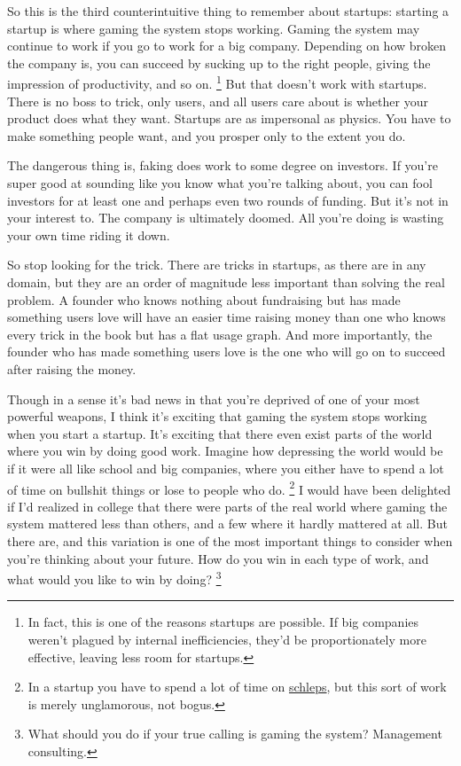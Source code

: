 So this is the third counterintuitive thing to remember about startups:
starting a startup is where gaming the system stops working. Gaming the
system may continue to work if you go to work for a big company.
Depending on how broken the company is, you can succeed by sucking up to
the right people, giving the impression of productivity, and so on.
\footnote{In fact, this is one of the reasons startups are possible. If
big companies weren't plagued by internal inefficiencies, they'd be
proportionately more effective, leaving less room for startups.} But that doesn't work with startups. There is no
boss to trick, only users, and all users care about is whether your
product does what they want. Startups are as impersonal as physics. You
have to make something people want, and you prosper only to the extent
you do.

The dangerous thing is, faking does work to some degree on investors. If
you're super good at sounding like you know what you're talking about,
you can fool investors for at least one and perhaps even two rounds of
funding. But it's not in your interest to. The company is ultimately
doomed. All you're doing is wasting your own time riding it down.

So stop looking for the trick. There are tricks in startups, as there
are in any domain, but they are an order of magnitude less important
than solving the real problem. A founder who knows nothing about
fundraising but has made something users love will have an easier time
raising money than one who knows every trick in the book but has a flat
usage graph. And more importantly, the founder who has made something
users love is the one who will go on to succeed after raising the money.

Though in a sense it's bad news in that you're deprived of one of your
most powerful weapons, I think it's exciting that gaming the system
stops working when you start a startup. It's exciting that there even
exist parts of the world where you win by doing good work. Imagine how
depressing the world would be if it were all like school and big
companies, where you either have to spend a lot of time on bullshit
things or lose to people who do. \footnote{In a startup you have to spend a lot of time on
\href{schlep.html}{schleps}, but this sort of work is merely
unglamorous, not bogus.} I would have
been delighted if I'd realized in college that there were parts of the
real world where gaming the system mattered less than others, and a few
where it hardly mattered at all. But there are, and this variation is
one of the most important things to consider when you're thinking about
your future. How do you win in each type of work, and what would you
like to win by doing? \footnote{What should you do if your true calling is gaming the system?
Management consulting.}


